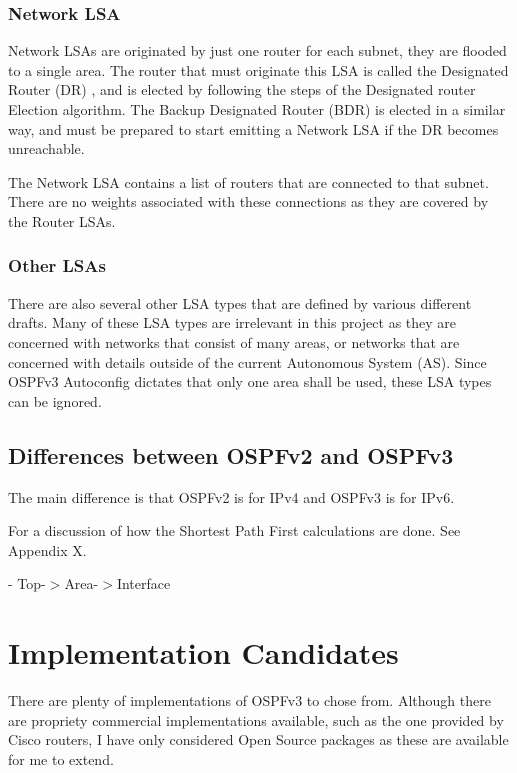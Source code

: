 \documentclass[12pt]{report}
\begin{document}
\subsubsection{Network LSA}
Network LSAs are originated by just one router for each subnet, they are
flooded to a single area. The router that must originate this LSA is called the
Designated Router (DR) , and is elected
by following the steps of the Designated router Election algorithm. The Backup
Designated Router (BDR)  is
elected in a similar way, and must be prepared to start emitting a Network LSA
if the DR becomes unreachable. 

The Network LSA contains a list of routers that are connected to that subnet.
There are no weights associated with these connections as they are covered by
the Router LSAs. 

\subsubsection{Other LSAs}
There are also several other LSA types that are defined by various different
drafts.  Many of these LSA types are irrelevant in this project as they are
concerned with networks that consist of many areas, or networks that are
concerned with details outside of the current Autonomous System (AS). Since
OSPFv3 Autoconfig dictates that only one area shall be used, these LSA types
can be ignored.   

\subsection{Differences between OSPFv2 and OSPFv3}
The main difference is that OSPFv2 is for IPv4 and OSPFv3 is for IPv6. 

For a discussion of how the Shortest Path First calculations are done. See
Appendix X. 


- Top-$>$Area-$>$Interface

\section{Implementation Candidates}
There are plenty of implementations of OSPFv3 to chose from. Although there
are propriety commercial implementations available, such as the one provided by
Cisco routers, I have only considered Open Source packages as these are
available for me to extend.
\end{document}
